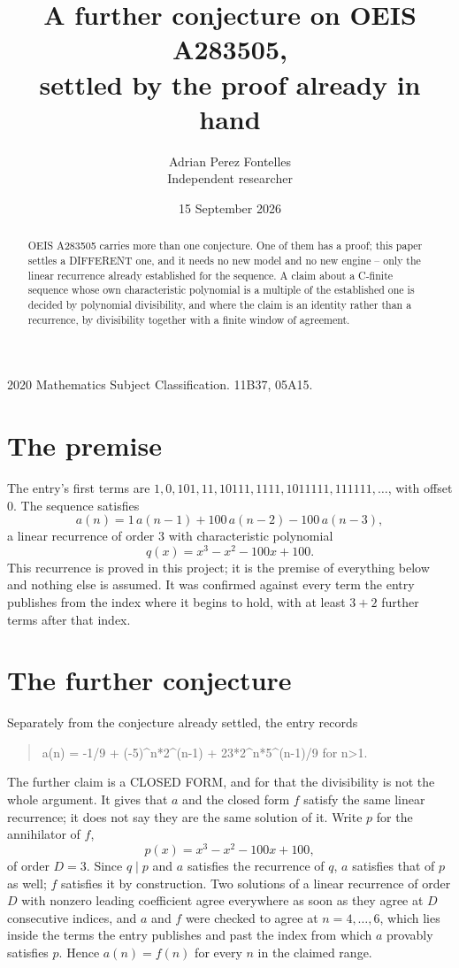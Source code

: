 \documentclass[11pt,a4paper]{article}
\title{A further conjecture on OEIS A283505,\\ \large settled by the proof already in hand}
\author{Adrian Perez Fontelles\\ \small Independent researcher}
\date{15 September 2026}
\theoremstyle{plain}
\theoremstyle{definition}
\begin{document}
\maketitle

\begin{abstract}
OEIS A283505 carries more than one conjecture. One of them has a proof; this paper settles a
DIFFERENT one, and it needs no new model and no new engine -- only the linear recurrence already
established for the sequence. A claim about a C-finite sequence whose own characteristic
polynomial is a multiple of the established one is decided by polynomial divisibility, and where
the claim is an identity rather than a recurrence, by divisibility together with a finite window
of agreement.
\end{abstract}

\noindent\small 2020 Mathematics Subject Classification. 11B37, 05A15.\normalsize

\section{The premise}

The entry's first terms are $1, 0, 101, 11, 10111, 1111, 1011111, 111111,\dots$, with offset $0$. The sequence satisfies
\[
  a(n)=1\,a(n-1) + 100\,a(n-2) - 100\,a(n-3) ,
\]
a linear recurrence of order $3$ with characteristic polynomial
\[
  q(x)=x^{3} - x^{2} - 100 x + 100 .
\]
This recurrence is proved in this project; it is the premise of everything below and nothing else is assumed.
It was confirmed against every term the entry publishes from the index where it begins to hold,
with at least $3+2$ further terms after that index.

\section{The further conjecture}

Separately from the conjecture already settled, the entry records

\begin{quote}\raggedright a(n) = -1/9 + (-5)\^{}n*2\^{}(n-1) + 23*2\^{}n*5\^{}(n-1)/9 for n>1.\end{quote}

The further claim is a CLOSED FORM, and for that the divisibility is not the whole argument. It
gives that $a$ and the closed form $f$ satisfy the same linear recurrence; it does not say they
are the same solution of it. Write $p$ for the annihilator of $f$,
\[
  p(x)=x^{3} - x^{2} - 100 x + 100 ,
\]
of order $D=3$. Since $q\mid p$ and $a$ satisfies the recurrence of $q$, $a$ satisfies that of
$p$ as well; $f$ satisfies it by construction. Two solutions of a linear recurrence of order $D$
with nonzero leading coefficient agree everywhere as soon as they agree at $D$ consecutive
indices, and $a$ and $f$ were checked to agree at $n=4,\dots,6$,
which lies inside the terms the entry publishes and past the index from which $a$ provably
satisfies $p$. Hence $a(n)=f(n)$ for every $n$ in the claimed range.
\end{document}
